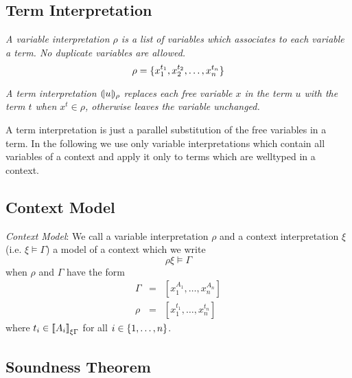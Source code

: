 \subsection{Term Interpretation}

\begin{definition}
    \emph{A variable interpretation $\rho$ is a list of variables which
    associates to each variable a term. No duplicate variables are allowed.}
    $$
        \rho = {\{x_1^{t_1}, x_2^{t_2}, \ldots, x_n^{t_n}\}}
    $$
\end{definition}


\begin{definition}
    \emph{A term interpretation ${(\!|u|\!)_{\rho}}$ replaces each free
    variable $x$ in the term $u$ with the term $t$ when $x^t \in \rho$,
    otherwise leaves the variable unchanged.}
\end{definition}

A term interpretation is just a parallel substitution of the free variables in a
term. In the following we use only variable interpretations which contain all
variables of a context and apply it only to terms which are welltyped in a
context.






\subsection{Context Model}

\begin{definition}
    \label{DefinitionContextModel}
    \emph{Context Model}: We call a variable interpretation $\rho$ and a context
    interpretation $\xi$ (i.e. $\xi \vDash \Gamma$) a model of a context which
    we write
    $$
        \rho\xi \vDash \Gamma
    $$
    when
    $\rho$ and $\Gamma$ have the form
    $$
    \begin{array}{lll}
        \Gamma &=& [x_1^{A_1}, \ldots, x_n^{A_n}]
        \\
        \rho   &=& [x_1^{t_1}, \ldots, x_n^{t_n}]
    \end{array}
    $$
    where $t_i \in {{{[\![}A_i {]\!]}}_{\xi\Gamma}}$ for all $i \in {\{1,\ldots,n\}}$.
\end{definition}




\subsection{Soundness Theorem}

